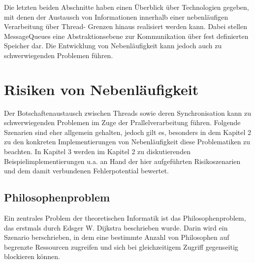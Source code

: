 \documentclass[12pt,oneside,a4paper,bibtotoc,liststotoc]{scrreprt}
\begin{document}
Die letzten beiden Abschnitte haben einen Überblick über Technologien gegeben, mit denen der Austausch von Informationen innerhalb einer nebenläufigen Verarbeitung über Thread- Grenzen hinaus realisiert werden kann. Dabei stellen MessageQueues eine Abstraktionsebene zur Kommunikation über fest definierten Speicher dar. Die Entwicklung von Nebenläufigkeit kann jedoch auch zu schwerwiegenden Problemen führen.


\section{Risiken von Nebenläufigkeit}
Der Botschaftenaustausch zwischen Threads sowie deren Synchronisation kann zu schwerwiegenden Problemen im Zuge der Prallelverarbeitung führen. Folgende Szenarien sind eher allgemein gehalten, jedoch gilt es, besonders in dem Kapitel 2  zu den konkreten Implementierungen von Nebenläufigkeit diese Problematiken zu beachten. In Kapitel 3 werden im Kapitel 2 zu diskutierenden Beispielimplementierungen u.a. an Hand der hier aufgeführten Risikoszenarien und dem damit verbundenen Fehlerpotential bewertet.

\subsection{Philosophenproblem}
Ein zentrales Problem der theoretischen Informatik ist das Philosophenproblem, das erstmals durch Edsger W. Dijkstra beschrieben wurde. Darin wird ein Szenario berschrieben, in dem eine bestimmte Anzahl von Philosophen auf begrenzte Ressourcen zugreifen und sich bei gleichzeitigem Zugriff gegenseitig blockieren können.
\end{document}
